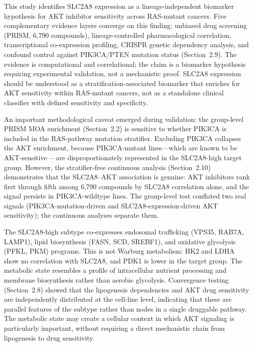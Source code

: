 \documentclass[12pt]{article}
\begin{document}
This study identifies SLC2A8 expression as a lineage-independent
biomarker hypothesis for AKT inhibitor sensitivity across RAS-mutant
cancers. Five complementary evidence layers converge on this finding:
unbiased drug screening (PRISM, 6,790 compounds), lineage-controlled
pharmacological correlation, transcriptional co-expression profiling,
CRISPR genetic dependency analysis, and confound control against
PIK3CA/PTEN mutation status (Section~2.9). The evidence is computational
and correlational; the claim is a biomarker hypothesis requiring
experimental validation, not a mechanistic proof. SLC2A8 expression
should be understood as a stratification-associated biomarker that
enriches for AKT sensitivity within RAS-mutant cancers, not as a
standalone clinical classifier with defined sensitivity and specificity.

An important methodological caveat emerged during validation: the
group-level PRISM MOA enrichment (Section~2.2) is sensitive to whether
PIK3CA is included in the RAS-pathway mutation stratifier. Excluding
PIK3CA collapses the AKT enrichment, because PIK3CA-mutant lines---which
are known to be AKT-sensitive \citep{Davies2012}---are disproportionately
represented in the SLC2A8-high target group. However, the
stratifier-free continuous analysis (Section~2.10) demonstrates that
the SLC2A8--AKT association is genuine: AKT inhibitors rank first through
fifth among 6,790 compounds by SLC2A8 correlation alone, and the signal
persists in PIK3CA-wildtype lines. The group-level test conflated two
real signals (PIK3CA-mutation-driven and SLC2A8-expression-driven AKT
sensitivity); the continuous analyses separate them.

The SLC2A8-high subtype co-expresses endosomal trafficking (VPS35,
RAB7A, LAMP1), lipid biosynthesis (FASN, SCD, SREBF1), and oxidative
glycolysis (PFKL, PKM) programs. This is not Warburg metabolism: HK2 and
LDHA show no correlation with SLC2A8, and PDK1 is lower in the target
group. The metabolic state resembles a profile of intracellular nutrient
processing and membrane biosynthesis rather than aerobic glycolysis.
Convergence testing (Section~2.8) showed that the lipogenesis
dependencies and AKT drug sensitivity are independently distributed at
the cell-line level, indicating that these are parallel features of the
subtype rather than nodes in a single druggable pathway. The metabolic
state may create a cellular context in which AKT signaling is
particularly important, without requiring a direct mechanistic chain
from lipogenesis to drug sensitivity.
\end{document}
